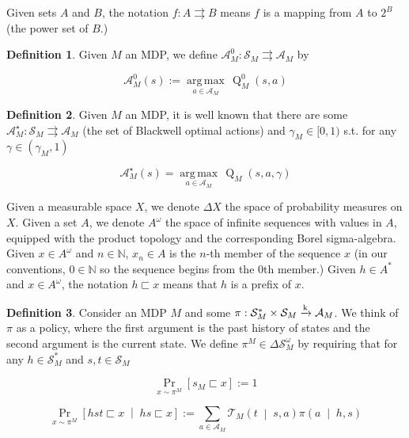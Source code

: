 \documentclass[11pt]{article}
\theoremstyle{definition}
\newtheorem{definition}{Definition}%
\theoremstyle{plain}
\newcommand{\AP}[1]{\left(#1\right)}
\newcommand{\AB}[1]{\left[#1\right]}
\newcommand{\APM}[2]{\left(#1\;\middle\vert\;#2\right)}
\newcommand{\ABM}[2]{\left[#1\;\middle\vert\;#2\right]}
\newcommand{\Pa}[2]{\underset{#1}{\operatorname{Pr}}\AB{#2}}
\newcommand{\CP}[3]{\underset{#1}{\operatorname{Pr}}\ABM{#2}{#3}}
\newcommand{\Argmax}[1]{\underset{#1}{\operatorname{arg\,max}}\,}
\newcommand{\Nats}{\mathbb{N}}
\newcommand{\K}{\xrightarrow{\textnormal{k}}}
\newcommand{\A}{\mathcal{A}}
\newcommand{\St}{\mathcal{S}}
\newcommand{\T}{\mathcal{T}}
\newcommand{\Q}{\operatorname{Q}}
\begin{document}
Given sets $A$ and $B$, the notation $f: A \rightrightarrows B$ means $f$ is a mapping from $A$ to $2^B$ (the power set of $B$.)

\begin{samepage}
\begin{definition}

Given $M$ an MDP, we define $\A_M^0: \St_M \rightrightarrows \A_M$ by

\begin{equation}
\A_M^0(s) := \Argmax{a \in \A_M} \Q_M^0(s,a)
\end{equation}

\end{definition}
\end{samepage}

\begin{samepage}
\begin{definition}

Given $M$ an MDP, it is well known that there are some $\A_M^\star: \St_M \rightrightarrows \A_M$ (the set of Blackwell optimal actions) and $\gamma_M\in[0,1)$ s.t. for any $\gamma\in\AP{\gamma_M,1}$

\begin{equation}
\A_M^\star(s) = \Argmax{a \in \A_M} \Q_M\AP{s,a,\gamma}
\end{equation}

\end{definition}
\end{samepage}

Given a measurable space $X$, we denote $\Delta X$ the space of probability measures on $X$. Given a set $A$, we denote $A^\omega$ the space of infinite sequences with values in $A$, equipped with the product topology and the corresponding Borel sigma-algebra. Given $x\in A^\omega$ and $n \in \Nats$, $x_n \in A$ is the $n$-th member of the sequence $x$ (in our conventions, $0 \in \Nats$ so the sequence begins from the 0th member.) Given $h \in A^*$ and $x \in A^\omega$, the notation $h \sqsubset x$ means that $h$ is a prefix of $x$.

\begin{samepage}
\begin{definition}

Consider an MDP $M$ and some $\pi: \St_M^* \times \St_M \K \A_M$. We think of $\pi$ as a policy, where the first argument is the past history of states and the second argument is the current state. We define $\pi^M \in \Delta\St_M^\omega$ by requiring that for any $h \in \St_M^*$ and $s,t \in \St_M$

\begin{equation}
\Pa{x\sim\pi^M }{s_M \sqsubset x} := 1
\end{equation}


\begin{equation}
\CP{x\sim\pi^M }{hst \sqsubset x}{hs \sqsubset x} := \sum_{a \in \A_M} {\T_M\APM{t}{s,a} \pi\APM{a}{h,s}}
\end{equation}

\end{definition}
\end{samepage}
\end{document}
